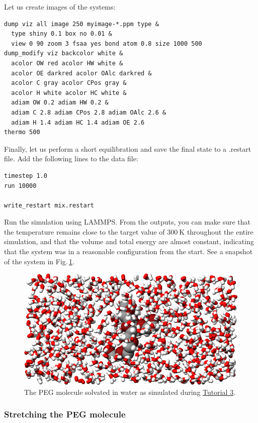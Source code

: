 \documentclass[9pt,tutorial]{livecoms}
\newcommand{\lmpcmd}[1]{\hspace{0pt}\colorbox{listing}{\textcolor{command}{\small{#1}}}\hspace{0pt}} %
\begin{document}
Let us create images of the systems:
\begin{lstlisting}
dump viz all image 250 myimage-*.ppm type &
  type shiny 0.1 box no 0.01 &
  view 0 90 zoom 3 fsaa yes bond atom 0.8 size 1000 500
dump_modify viz backcolor white &
  acolor OW red acolor HW white &
  acolor OE darkred acolor OAlc darkred &
  acolor C gray acolor CPos gray &
  acolor H white acolor HC white &
  adiam OW 0.2 adiam HW 0.2 &
  adiam C 2.8 adiam CPos 2.8 adiam OAlc 2.6 &
  adiam H 1.4 adiam HC 1.4 adiam OE 2.6
thermo 500
\end{lstlisting}
Finally, let us perform a short equilibration and save the
final state to a \lmpcmd{.restart} file.  Add the following lines to the data file:
\begin{lstlisting}
timestep 1.0
run 10000

write_restart mix.restart
\end{lstlisting}
Run the simulation using LAMMPS.  From the outputs, you can make
sure that the temperature remains close to the
target value of $300~\text{K}$ throughout the entire simulation, and that
the volume and total energy are almost constant, indicating
that the system was in a reasonable configuration from the start.
See a snapshot of the system in Fig.\,\ref{fig:PEG-solvated}.

\begin{figure}
\centering
\includegraphics[width=\linewidth]{PEG-solvated}
\caption{The PEG molecule solvated in water as simulated during
\hyperref[all-atom-label]{Tutorial 3}.}
\label{fig:PEG-solvated}
\end{figure}

\subsubsection{Stretching the PEG molecule}
\end{document}
